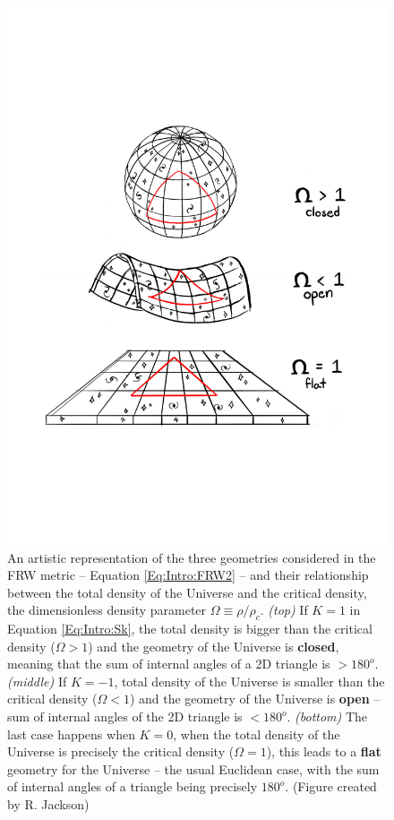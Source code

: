 \begin{figure}
\begin{center}
\includegraphics[width=\textwidth]{Intro-FIGS/universeGeometry}
\caption[Artistic representation of the geometry of the Universe and its matter-energy content. Figure created by R. Jackson.]{An artistic representation of the three geometries considered in the FRW metric -- Equation \eqref{Eq:Intro:FRW2} -- and their relationship between the total density of the Universe and the critical density, the dimensionless density parameter $\Omega \equiv \rho/\rho_c$. \textit{(top)} If $K = 1$ in Equation \eqref{Eq:Intro:Sk}, the total density is bigger than the critical density ($\Omega > 1$) and the geometry of the Universe is \textbf{closed}, meaning that the sum of internal angles of a 2D triangle is $> 180^o$. \textit{(middle)} If $K = -1$, total density of the Universe is smaller than the critical density ($\Omega < 1$) and the geometry of the Universe is \textbf{open} -- sum of internal angles of the 2D triangle is $< 180^o$. \textit{(bottom)} The last case happens when $K = 0$, when the total density of the Universe is precisely the critical density ($\Omega = 1$), this leads to a \textbf{flat} geometry for the Universe -- the usual Euclidean case, with the sum of internal angles of a triangle being precisely $180^o$. (Figure created by R. Jackson)}
\label{fig:Intro:Geometry}
\end{center}
\end{figure}

